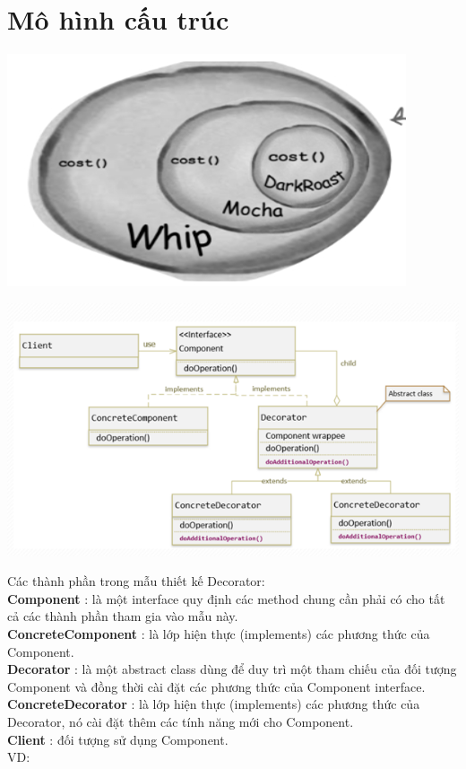 \section{Mô hình cấu trúc}
\begin{center}
	\includegraphics{GALLEYS/images/chapter4/diagram1}\\
\end{center}
\begin{center}
	\includegraphics{GALLEYS/images/chapter4/diagram2}\\
\end{center}
Các thành phần trong mẫu thiết kế Decorator:\\
\textbf{Component} : là một interface quy định các method chung cần phải có cho tất cả các thành phần tham gia vào mẫu này.\\
\textbf{ConcreteComponent } : là lớp hiện thực (implements) các phương thức của Component.\\
\textbf{Decorator} : là một abstract class dùng để duy trì một tham chiếu của đối tượng Component và đồng thời cài đặt các phương thức của Component  interface.\\
\textbf{ConcreteDecorator } : là lớp hiện thực (implements) các phương thức của Decorator, nó cài đặt thêm các tính năng mới cho Component.\\
\textbf{Client} : đối tượng sử dụng Component.\\
VD:\\

